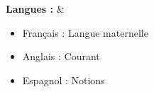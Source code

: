 \textbf{Langues :}
& \begin{itemize}
    \item Français : Langue maternelle
    \item Anglais : Courant
    \item Espagnol : Notions
\end{itemize}

